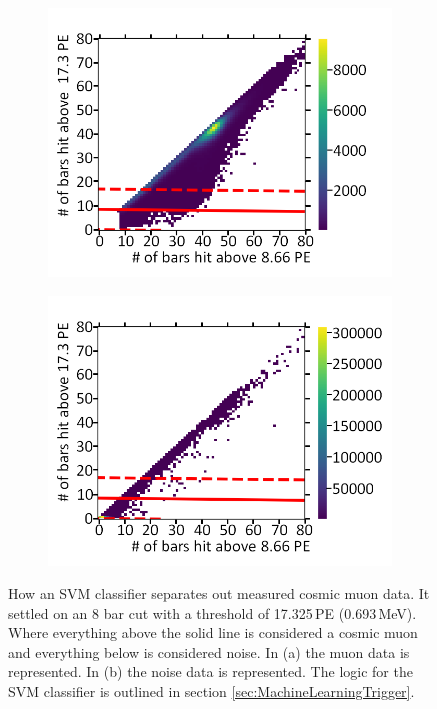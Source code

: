 \begin{figure}[!h]
\centering
\begin{subfigure}{.5\textwidth}
  \centering
  \includegraphics[width=\linewidth]{Chapter6/Figs/Raster/Cosmic8BarSignalCutSvmMedText.png}
  \captionsetup{width=.9\linewidth}
  \caption{}
  \label{subFig:cosmic8BarSignalCutSVM}
\end{subfigure}%
\begin{subfigure}{.5\textwidth}
  \centering
\includegraphics[width=\linewidth]{Chapter6/Figs/Raster/Cosmic8BarNoiseCutSvmMedText.png}
  \captionsetup{width=.9\linewidth}
  \caption{}
  \label{subFig:cosmic8BarNoiseCutSVM}
\end{subfigure}
\caption[An SVM classifier separating cosmic signal from noise.]{How an SVM classifier separates out measured cosmic muon data. It settled on an 8 bar cut with a threshold of 17.325\,PE (0.693\,MeV). Where everything above the solid line is considered a cosmic muon and everything below is considered noise. In (a) the muon data is represented. In (b) the noise data is represented. The logic for the SVM classifier is outlined in section \ref{sec:MachineLearningTrigger}.}
\label{fig:cosmic8BarSignalNoiseCutSVM}
\end{figure}

